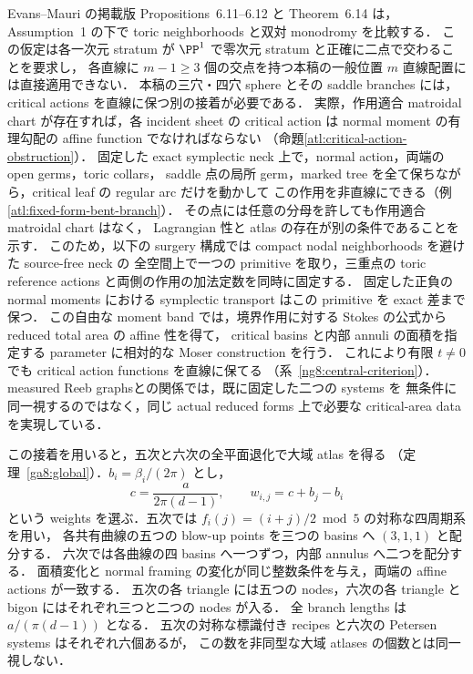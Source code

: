 Evans--Mauri の掲載版 Propositions~6.11--6.12 と Theorem~6.14 は，
Assumption~1 の下で toric neighborhoods と双対 monodromy を比較する\cite{EM}．
この仮定は各一次元 stratum が $\PP^1$ で零次元 stratum と正確に二点で交わることを要求し，
各直線に $m-1\ge3$ 個の交点を持つ本稿の一般位置 $m$ 直線配置には直接適用できない．
本稿の三穴・四穴 sphere とその saddle branches には，critical actions を直線に保つ別の接着が必要である．
実際，作用適合 matroidal chart が存在すれば，各 incident sheet の critical action は
normal moment の有理勾配の affine function でなければならない
（命題\ref{atl:critical-action-obstruction}）．
固定した exact symplectic neck 上で，normal action，両端の open germs，toric collars，
saddle 点の局所 germ，marked tree を全て保ちながら，critical leaf の regular arc だけを動かして
この作用を非直線にできる（例\ref{atl:fixed-form-bent-branch}）．
その点には任意の分母を許しても作用適合 matroidal chart はなく，
Lagrangian 性と atlas の存在が別の条件であることを示す．
このため，以下の surgery 構成では compact nodal neighborhoods を避けた source-free neck の
全空間上で一つの primitive を取り，三重点の toric reference actions
と両側の作用の加法定数を同時に固定する．
固定した正負の normal moments における symplectic transport はこの primitive を exact 差まで保つ．
この自由な moment band では，境界作用に対する Stokes の公式から reduced total area の affine 性を得て，
critical basins と内部 annuli の面積を指定する parameter に相対的な Moser construction を行う．
これにより有限 $t\ne0$ でも critical action functions を直線に保てる
（系~\ref{ng8:central-criterion}）．
measured Reeb graphs\cite{DMT,IKM}との関係では，既に固定した二つの systems を
無条件に同一視するのではなく，同じ actual reduced forms 上で必要な critical-area data を実現している．

この接着を用いると，五次と六次の全平面退化で大域 atlas を得る
（定理~\ref{ga8:global}）．$b_i=\beta_i/(2\pi)$ とし，
\[
 c=\frac{a}{2\pi(d-1)},\qquad w_{i,j}=c+b_j-b_i
\]
という weights を選ぶ．五次では $f_i(j)=(i+j)/2\bmod5$ の対称な四周期系を用い，
各共有曲線の五つの blow-up points を三つの basins へ $(3,1,1)$ と配分する．
六次では各曲線の四 basins へ一つずつ，内部 annulus へ二つを配分する．
面積変化と normal framing の変化が同じ整数条件を与え，両端の affine actions が一致する．
五次の各 triangle には五つの nodes，六次の各 triangle と bigon にはそれぞれ三つと二つの nodes が入る．
全 branch lengths は $a/(\pi(d-1))$ となる．
五次の対称な標識付き recipes と六次の Petersen systems はそれぞれ六個あるが，
この数を非同型な大域 atlases の個数とは同一視しない．

